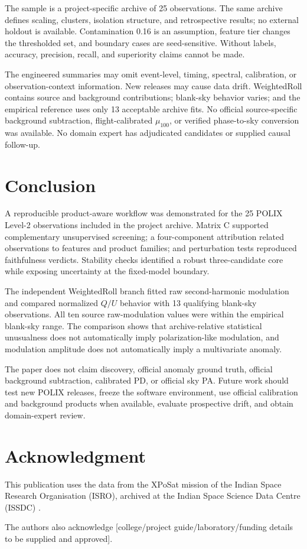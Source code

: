 \documentclass[conference]{IEEEtran}
\begin{document}
The sample is a project-specific archive of 25 observations. The same archive defines scaling, clusters, isolation structure, and retrospective results; no external holdout is available. Contamination 0.16 is an assumption, feature tier changes the thresholded set, and boundary cases are seed-sensitive. Without labels, accuracy, precision, recall, and superiority claims cannot be made.

The engineered summaries may omit event-level, timing, spectral, calibration, or observation-context information. New releases may cause data drift. WeightedRoll contains source and background contributions; blank-sky behavior varies; and the empirical reference uses only 13 acceptable archive fits. No official source-specific background subtraction, flight-calibrated \(\mu_{100}\), or verified phase-to-sky conversion was available. No domain expert has adjudicated candidates or supplied causal follow-up.

\section{Conclusion}

A reproducible product-aware workflow was demonstrated for the 25 POLIX Level-2 observations included in the project archive. Matrix C supported complementary unsupervised screening; a four-component attribution related observations to features and product families; and perturbation tests reproduced faithfulness verdicts. Stability checks identified a robust three-candidate core while exposing uncertainty at the fixed-model boundary.

The independent WeightedRoll branch fitted raw second-harmonic modulation and compared normalized \(Q/U\) behavior with 13 qualifying blank-sky observations. All ten source raw-modulation values were within the empirical blank-sky range. The comparison shows that archive-relative statistical unusualness does not automatically imply polarization-like modulation, and modulation amplitude does not automatically imply a multivariate anomaly.

The paper does not claim discovery, official anomaly ground truth, official background subtraction, calibrated PD, or official sky PA. Future work should test new POLIX releases, freeze the software environment, use official calibration and background products when available, evaluate prospective drift, and obtain domain-expert review.

\section*{Acknowledgment}

This publication uses the data from the XPoSat mission of the Indian Space Research Organisation (ISRO), archived at the Indian Space Science Data Centre (ISSDC) \cite{xposat_ack}.

The authors also acknowledge [college/project guide/laboratory/funding details to be supplied and approved].



\end{document}
